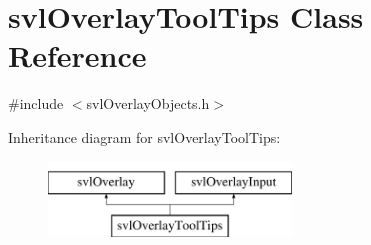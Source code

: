 \hypertarget{classsvl_overlay_tool_tips}{}\section{svl\+Overlay\+Tool\+Tips Class Reference}
\label{classsvl_overlay_tool_tips}


{\ttfamily \#include $<$svl\+Overlay\+Objects.\+h$>$}

Inheritance diagram for svl\+Overlay\+Tool\+Tips\+:\begin{figure}[H]
\begin{center}
\leavevmode
\includegraphics[height=2.000000cm]{d5/dc1/classsvl_overlay_tool_tips}
\end{center}
\end{figure}
